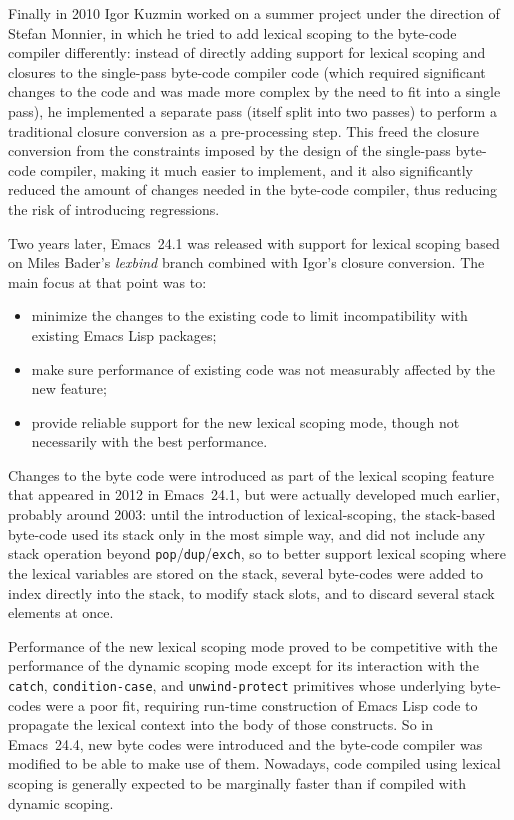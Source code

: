 \documentclass[format=acmsmall,screen]{acmart}
\newcommand \Elisp {Emacs Lisp}
\begin{document}
Finally in 2010 Igor Kuzmin worked on a summer project under the direction
of Stefan Monnier, in which he tried to add lexical scoping to the
byte-code compiler differently:
instead of directly adding support for lexical scoping and closures to the
single-pass byte-code compiler code (which required significant changes to the
code and was made more complex by the need to fit into a single pass), he
implemented a separate pass (itself split into two passes) to perform
a traditional closure conversion as a pre-processing step.  This freed the
closure conversion from the constraints imposed by the design of the
single-pass byte-code compiler, making it much easier to implement, and it also
significantly reduced the amount of changes needed in the byte-code compiler,
thus reducing the risk of introducing regressions.

Two years later, Emacs~24.1 was released with support for lexical
scoping based on Miles Bader's \emph{lexbind} branch combined with Igor's
closure conversion.  The main focus at that point was to:
\begin{itemize}
\item minimize the changes to the existing code to limit incompatibility
  with existing \Elisp{} packages;
\item make sure performance of existing code was not measurably affected by
  the new feature;
\item provide reliable support for the new lexical scoping mode, though not
  necessarily with the best performance.
\end{itemize}
Changes to the byte code were introduced as part of the lexical scoping
feature that appeared in 2012 in Emacs~24.1, but were actually developed
much earlier, probably around 2003: until the introduction of
lexical-scoping, the stack-based byte-code used its stack only in the most
simple way, and did not include any stack operation beyond
\texttt{pop}/\texttt{dup}/\texttt{exch}, so to better support lexical
scoping where the lexical variables are stored on the stack, several
byte-codes were added to index directly into the stack, to modify stack
slots, and to discard several stack elements at once.

Performance of the new lexical scoping mode proved to be competitive with
the performance of the dynamic scoping mode except for its interaction with
the \texttt{catch}, \texttt{condition-case}, and \texttt{unwind-protect}
primitives whose underlying byte-codes were a poor fit, requiring run-time
construction of \Elisp{} code to propagate the lexical context into the body
of those constructs.
So in Emacs~24.4, new byte codes were introduced and
the byte-code compiler was modified to be able to make use of them.  Nowadays,
code compiled using lexical scoping is generally expected to be marginally
faster than if compiled with dynamic scoping.
\end{document}
